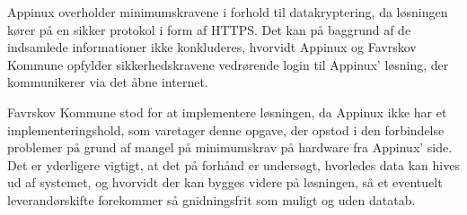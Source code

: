 Appinux overholder minimumskravene i forhold til datakryptering, da løsningen kører på en sikker protokol i form af HTTPS. Det kan på baggrund af de indsamlede informationer ikke konkluderes, hvorvidt Appinux og Favrskov Kommune opfylder sikkerhedskravene vedrørende login til Appinux' løsning, der kommunikerer via det åbne internet. 

Favrskov Kommune stod for at implementere løsningen, da Appinux ikke har et implementeringshold, som varetager denne opgave, der opstod i den forbindelse problemer på grund af mangel på minimumskrav på hardware fra Appinux' side. Det er yderligere vigtigt, at det på forhånd er undersøgt, hvorledes data kan hives ud af systemet, og hvorvidt der kan bygges videre på løsningen, så et eventuelt leverandørskifte forekommer så gnidningsfrit som muligt og uden datatab.
